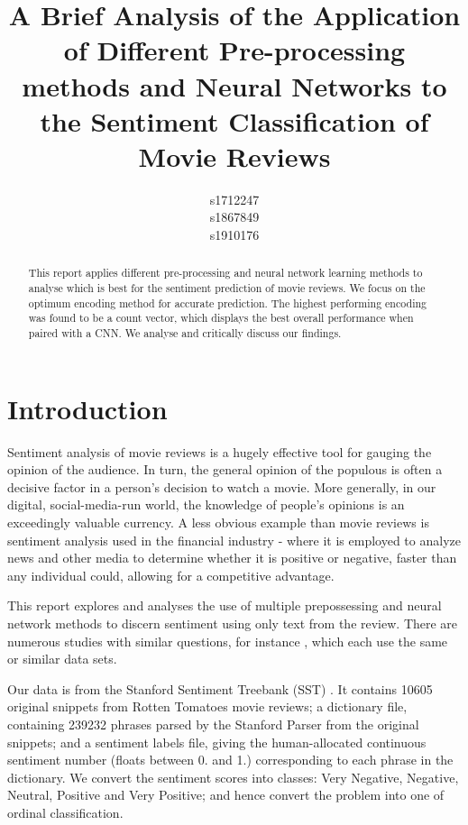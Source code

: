 \documentclass{article}
\title{A Brief Analysis of the Application of Different Pre-processing methods and Neural Networks to the Sentiment Classification of Movie Reviews}
\author{
  s1712247\\
  \And
  s1867849\\
 \And
  s1910176\\
}
\begin{document}
\maketitle

\begin{abstract}
 This report applies different pre-processing and neural network learning methods to analyse which is best for the sentiment prediction of movie reviews. We focus on the optimum encoding method for accurate prediction. The highest performing encoding was found to be a count vector, which displays the best overall performance when paired with a CNN. We analyse and critically discuss our findings.
\end{abstract}
\section{Introduction}
Sentiment analysis of movie reviews is a hugely effective tool for gauging the opinion of the audience. \cite{10.1145/3302425.3302469}
In turn, the general opinion of the populous is often a decisive factor in a person's decision to watch a movie. More generally, in our digital, social-media-run world, the knowledge of people's opinions is an exceedingly valuable currency. A less obvious example than movie reviews is sentiment analysis used in the financial industry - where it is employed to analyze news and other media to determine whether it is positive or negative, faster than any individual could, allowing for a competitive advantage.

This report explores and analyses the use of multiple prepossessing and neural network methods to discern sentiment using only text from the review. There are numerous studies with similar questions, for instance \cite{10.1145/3302425.3302469} \cite{chaudhary_2020} \cite{unknown31}, which each use the same or similar data sets.

Our data is from  the Stanford Sentiment Treebank (SST) \cite{socher-etal-2013-recursive}. It contains 10605 original snippets from Rotten Tomatoes movie reviews; a dictionary file, containing 239232 phrases parsed by the Stanford Parser from the original snippets; and a sentiment labels file, giving the human-allocated continuous sentiment number (floats between 0. and 1.) corresponding to each phrase in the dictionary. We convert the sentiment scores into classes: Very Negative, Negative, Neutral, Positive and Very Positive; and hence convert the problem into one of ordinal classification.
\end{document}
